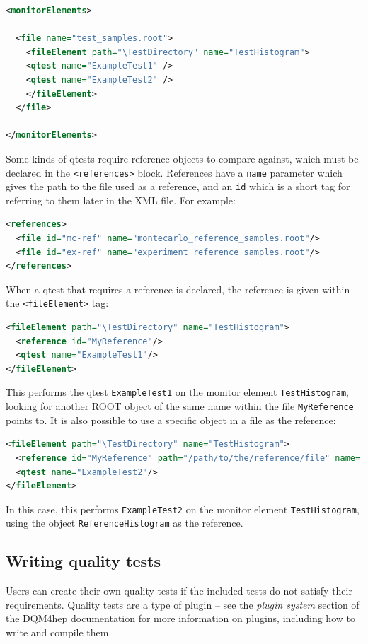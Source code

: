 \begin{lstlisting}[language=XML]
<monitorElements>

  <file name="test_samples.root">
    <fileElement path="\TestDirectory" name="TestHistogram">
    <qtest name="ExampleTest1" />
    <qtest name="ExampleTest2" />
    </fileElement>
  </file>

</monitorElements>
\end{lstlisting}

Some kinds of \acrshort{qtest}s require reference objects to compare against, which must be declared in the \texttt{<references>} block. References have a \texttt{name} parameter which gives the path to the file used as a reference, and an \texttt{id} which is a short tag for referring to them later in the XML file. For example:

\begin{lstlisting}[language=XML]
<references>
  <file id="mc-ref" name="montecarlo_reference_samples.root"/>
  <file id="ex-ref" name="experiment_reference_samples.root"/>
</references>
\end{lstlisting}

When a \acrshort{qtest} that requires a reference is declared, the reference is given within the \texttt{<fileElement>} tag:

\begin{lstlisting}[language=XML]
<fileElement path="\TestDirectory" name="TestHistogram">
  <reference id="MyReference"/>
  <qtest name="ExampleTest1"/>
</fileElement>
\end{lstlisting}

This performs the \acrshort{qtest} \texttt{ExampleTest1} on the monitor element \texttt{TestHistogram}, looking for another ROOT object of the same name within the file \texttt{MyReference} points to. It is also possible to use a specific object in a file as the reference:

\begin{lstlisting}[language=XML]
<fileElement path="\TestDirectory" name="TestHistogram">
  <reference id="MyReference" path="/path/to/the/reference/file" name="ReferenceHistogram"/>
  <qtest name="ExampleTest2"/>
</fileElement>
\end{lstlisting}

In this case, this performs \texttt{ExampleTest2} on the monitor element \texttt{TestHistogram}, using the object \texttt{ReferenceHistogram} as the reference. 

\subsection{Writing quality tests}
Users can create their own quality tests if the included tests do not satisfy their requirements. Quality tests are a type of plugin – see the \textit{plugin system} section of the \acrshort{DQM4hep} documentation  for more information on plugins, including how to write and compile them.

